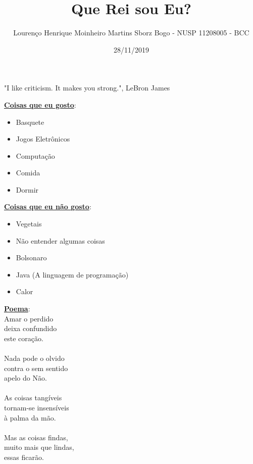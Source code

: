 \documentclass[12pt, oneside]{article}
\title{Que Rei sou Eu?}
\author{Lourenço Henrique Moinheiro Martins Sborz Bogo - NUSP 11208005 - BCC}
\date{28/11/2019}
\newcommand{\mytitle}[1]{\textbf{\underline{#1}}}
\begin{document}
\maketitle
\begin{center}
  "I like criticism. It makes you strong.", LeBron James
\end{center}
\mytitle{Coisas que eu gosto}:
\begin{itemize}
\item Basquete
\item Jogos Eletrônicos
\item Computação
\item Comida
\item Dormir
\end{itemize}
\mytitle{Coisas que eu não gosto}:
\begin{itemize}
\item Vegetais
\item Não entender algumas coisas
\item Bolsonaro
\item Java (A linguagem de programação)
\item Calor
\end{itemize}
\newpage
\mytitle{Poema}:\\
Amar o perdido\\
deixa confundido\\
este coração.\\
\\
Nada pode o olvido\\
contra o sem sentido\\
apelo do Não.\\
\\
As coisas tangíveis\\
tornam-se insensíveis\\
à palma da mão.\\
\\
Mas as coisas findas,\\
muito mais que lindas,\\
essas ficarão.\\
\end{document}
